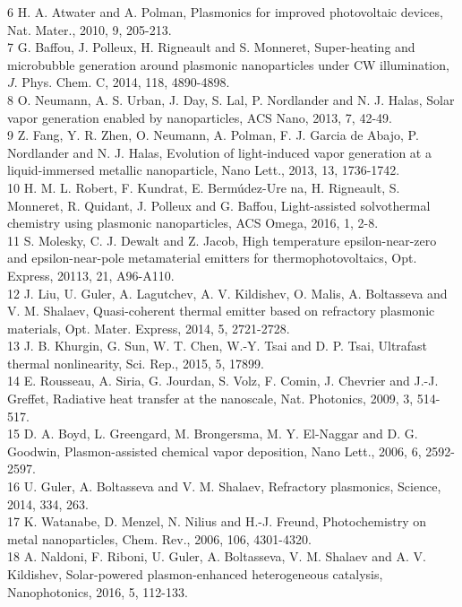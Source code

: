 \documentclass[10pt]{article}
\begin{document}
6 H. A. Atwater and A. Polman, Plasmonics for improved photovoltaic devices, Nat. Mater., 2010, 9, 205-213.\\
7 G. Baffou, J. Polleux, H. Rigneault and S. Monneret, Super-heating and microbubble generation around plasmonic nanoparticles under CW illumination, $J$. Phys. Chem. C, 2014, 118, 4890-4898.\\
8 O. Neumann, A. S. Urban, J. Day, S. Lal, P. Nordlander and N. J. Halas, Solar vapor generation enabled by nanoparticles, ACS Nano, 2013, 7, 42-49.\\
9 Z. Fang, Y. R. Zhen, O. Neumann, A. Polman, F. J. Garcia de Abajo, P. Nordlander and N. J. Halas, Evolution of light-induced vapor generation at a liquid-immersed metallic nanoparticle, Nano Lett., 2013, 13, 1736-1742.\\
10 H. M. L. Robert, F. Kundrat, E. Bermúdez-Ure na, H. Rigneault, S. Monneret, R. Quidant, J. Polleux and G. Baffou, Light-assisted solvothermal chemistry using plasmonic nanoparticles, ACS Omega, 2016, 1, 2-8.\\
11 S. Molesky, C. J. Dewalt and Z. Jacob, High temperature epsilon-near-zero and epsilon-near-pole metamaterial emitters for thermophotovoltaics, Opt. Express, 20113, 21, A96-A110.\\
12 J. Liu, U. Guler, A. Lagutchev, A. V. Kildishev, O. Malis, A. Boltasseva and V. M. Shalaev, Quasi-coherent thermal emitter based on refractory plasmonic materials, Opt. Mater. Express, 2014, 5, 2721-2728.\\
13 J. B. Khurgin, G. Sun, W. T. Chen, W.-Y. Tsai and D. P. Tsai, Ultrafast thermal nonlinearity, Sci. Rep., 2015, 5, 17899.\\
14 E. Rousseau, A. Siria, G. Jourdan, S. Volz, F. Comin, J. Chevrier and J.-J. Greffet, Radiative heat transfer at the nanoscale, Nat. Photonics, 2009, 3, 514-517.\\
15 D. A. Boyd, L. Greengard, M. Brongersma, M. Y. El-Naggar and D. G. Goodwin, Plasmon-assisted chemical vapor deposition, Nano Lett., 2006, 6, 2592-2597.\\
16 U. Guler, A. Boltasseva and V. M. Shalaev, Refractory plasmonics, Science, 2014, 334, 263.\\
17 K. Watanabe, D. Menzel, N. Nilius and H.-J. Freund, Photochemistry on metal nanoparticles, Chem. Rev., 2006, 106, 4301-4320.\\
18 A. Naldoni, F. Riboni, U. Guler, A. Boltasseva, V. M. Shalaev and A. V. Kildishev, Solar-powered plasmon-enhanced heterogeneous catalysis, Nanophotonics, 2016, 5, 112-133.\\
\end{document}
